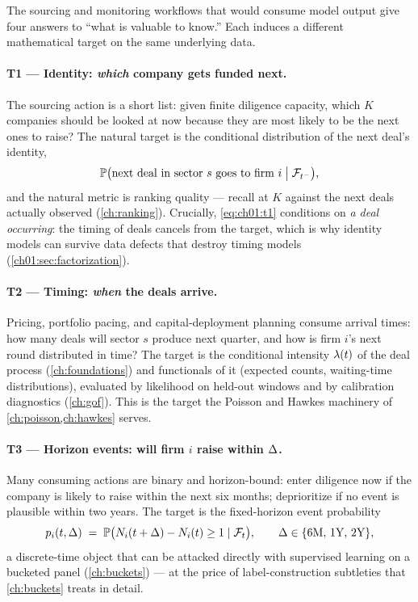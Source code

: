 The sourcing and monitoring workflows that would consume model output give
four answers to ``what is valuable to know.'' Each induces a different
mathematical target on the same underlying data.

\paragraph{T1 --- Identity: \emph{which} company gets funded next.}
The sourcing action is a short list: given finite diligence capacity, which
$K$ companies should be looked at now because they are most likely to be the
next ones to raise? The natural target is the conditional distribution of
the next deal's identity,
\begin{equation}\label{eq:ch01:t1}
\mathbb{P}\big(\text{next deal in sector } s \text{ goes to firm } i
 \;\big|\; \mathcal{F}_{t^-}\big),
\end{equation}
and the natural metric is ranking quality --- recall at $K$ against the next
deals actually observed (\cref{ch:ranking}). Crucially, \cref{eq:ch01:t1}
conditions on \emph{a deal occurring}: the timing of deals cancels from the
target, which is why identity models can survive data defects that destroy
timing models (\cref{ch01:sec:factorization}).

\paragraph{T2 --- Timing: \emph{when} the deals arrive.}
Pricing, portfolio pacing, and capital-deployment planning consume arrival
times: how many deals will sector $s$ produce next quarter, and how is firm
$i$'s next round distributed in time? The target is the conditional
intensity $\lambda(t)$ of the deal process (\cref{ch:foundations}) and
functionals of it (expected counts, waiting-time distributions), evaluated
by likelihood on held-out windows and by calibration diagnostics
(\cref{ch:gof}). This is the target the Poisson and Hawkes machinery of
\cref{ch:poisson,ch:hawkes} serves.

\paragraph{T3 --- Horizon events: will firm $i$ raise within $\Delta$.}
Many consuming actions are binary and horizon-bound: enter diligence now if
the company is likely to raise within the next six months; deprioritize if
no event is plausible within two years. The target is the fixed-horizon
event probability
\begin{equation}\label{eq:ch01:t3}
p_{i}(t,\Delta)
 \;=\;
 \mathbb{P}\big(N_{i}(t+\Delta) - N_{i}(t) \ge 1 \mid \mathcal{F}_{t}\big),
 \qquad \Delta \in \{\text{6M},\, \text{1Y},\, \text{2Y}\},
\end{equation}
a discrete-time object that can be attacked directly with supervised
learning on a bucketed panel (\cref{ch:buckets}) --- at the price of
label-construction subtleties that \cref{ch:buckets} treats in detail.

